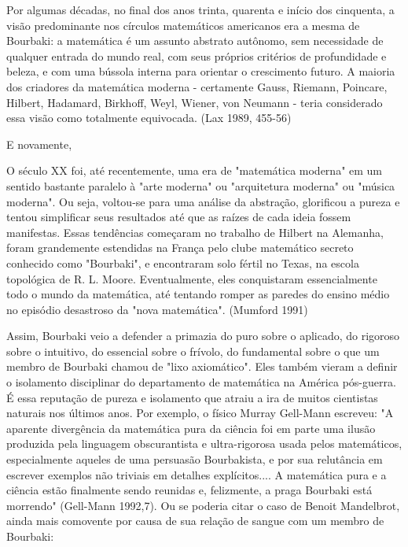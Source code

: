 \documentclass[12pt]{article}
\begin{document}
Por algumas décadas, no final dos anos trinta, quarenta e início dos cinquenta, a visão predominante nos círculos matemáticos americanos era a mesma de Bourbaki: a matemática é um assunto abstrato autônomo, sem necessidade de qualquer entrada do mundo real, com seus próprios critérios de profundidade e beleza, e com uma bússola interna para orientar o crescimento futuro. A maioria dos criadores da matemática moderna - certamente Gauss, Riemann, Poincare, Hilbert, Hadamard, Birkhoff, Weyl, Wiener, von Neumann - teria considerado essa visão como totalmente equivocada. (Lax 1989, 455-56)

E novamente,

O século XX foi, até recentemente, uma era de "matemática moderna" em um sentido bastante paralelo à "arte moderna" ou "arquitetura moderna" ou "música moderna". Ou seja, voltou-se para uma análise da abstração, glorificou a pureza e tentou simplificar seus resultados até que as raízes de cada ideia fossem manifestas. Essas tendências começaram no trabalho de Hilbert na Alemanha, foram grandemente estendidas na França pelo clube matemático secreto conhecido como "Bourbaki", e encontraram solo fértil no Texas, na escola topológica de R. L. Moore. Eventualmente, eles conquistaram essencialmente todo o mundo da matemática, até tentando romper as paredes do ensino médio no episódio desastroso da "nova matemática". (Mumford 1991)

Assim, Bourbaki veio a defender a primazia do puro sobre o aplicado, do rigoroso sobre o intuitivo, do essencial sobre o frívolo, do fundamental sobre o que um membro de Bourbaki chamou de "lixo axiomático". Eles também vieram a definir o isolamento disciplinar do departamento de matemática na América pós-guerra. É essa reputação de pureza e isolamento que atraiu a ira de muitos cientistas naturais nos últimos anos. Por exemplo, o físico Murray Gell-Mann escreveu: "A aparente divergência da matemática pura da ciência foi em parte uma ilusão produzida pela linguagem obscurantista e ultra-rigorosa usada pelos matemáticos, especialmente aqueles de uma persuasão Bourbakista, e por sua relutância em escrever exemplos não triviais em detalhes explícitos.... A matemática pura e a ciência estão finalmente sendo reunidas e, felizmente, a praga Bourbaki está morrendo" (Gell-Mann 1992,7). Ou se poderia citar o caso de Benoit Mandelbrot, ainda mais comovente por causa de sua relação de sangue com um membro de Bourbaki:
\end{document}
